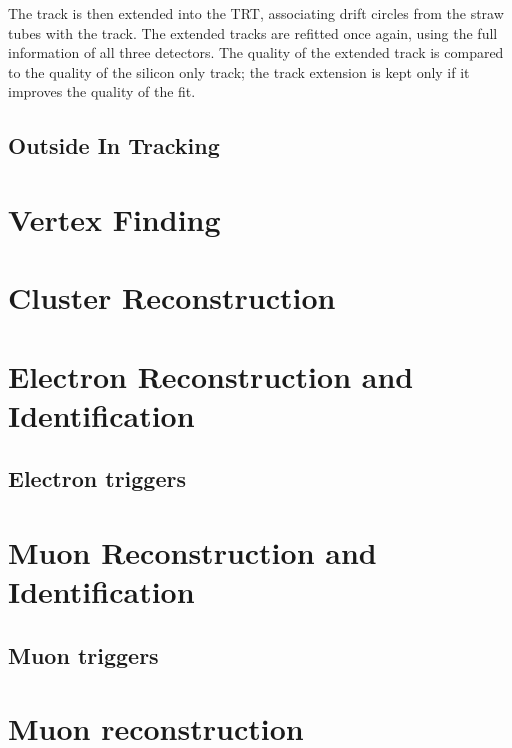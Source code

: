 The track is then extended into the TRT, associating drift circles from the
straw tubes with the track. The extended tracks are refitted once again, using
the full information of all three detectors. The quality of the extended track
is compared to the quality of the silicon only track; the track extension is
kept only if it improves the quality of the fit.

\subsection{Outside In Tracking}

\label{sec:reco-tracking}
\section{Vertex Finding}
\label{sec:reco-vertexing}
\section{Cluster Reconstruction}
\label{sec:reco-clustering}
\section{Electron Reconstruction and Identification}
\label{sec:reco-el}
\subsection{Electron triggers}
\label{sec:reco-triggers}
\section{Muon Reconstruction and Identification}
\label{sec:reco-mu}
\subsection{Muon triggers}
\label{sec:reco-triggers}
\section{Muon reconstruction}
